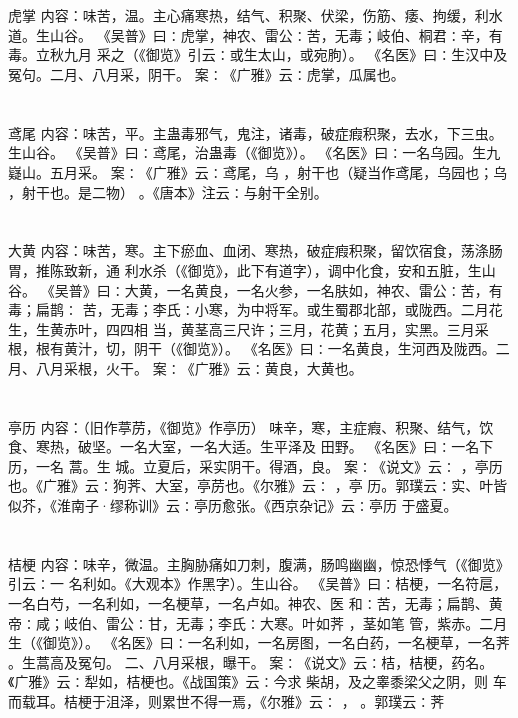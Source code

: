 \documentclass[12pt,UTF8]{ctexbook}
\begin{document}
\section{}虎掌
内容：味苦，温。主心痛寒热，结气、积聚、伏梁，伤筋、痿、拘缓，利水道。生山谷。 
《吴普》曰∶虎掌，神农、雷公∶苦，无毒；岐伯、桐君∶辛，有毒。立秋九月 
采之（《御览》引云∶或生太山，或宛朐）。 
《名医》曰∶生汉中及冤句。二月、八月采，阴干。 
案∶《广雅》云∶虎掌，瓜属也。 


\section{}鸢尾
内容：味苦，平。主蛊毒邪气，鬼注，诸毒，破症瘕积聚，去水，下三虫。生山谷。 
《吴普》曰∶鸢尾，治蛊毒（《御览》）。 
《名医》曰∶一名乌园。生九嶷山。五月采。 
案∶《广雅》云∶鸢尾，乌 ，射干也（疑当作鸢尾，乌园也；乌 ，射干也。是二物） 
。《唐本》注云∶与射干全别。 


\section{}大黄
内容：味苦，寒。主下瘀血、血闭、寒热，破症瘕积聚，留饮宿食，荡涤肠胃，推陈致新，通 
利水杀（《御览》，此下有道字），调中化食，安和五脏，生山谷。 
《吴普》曰∶大黄，一名黄良，一名火参，一名肤如，神农、雷公∶苦，有毒；扁鹊∶ 
苦，无毒；李氏∶小寒，为中将军。或生蜀郡北部，或陇西。二月花生，生黄赤叶，四四相 
当，黄茎高三尺许；三月，花黄；五月，实黑。三月采根，根有黄汁，切，阴干（《御览》）。 
《名医》曰∶一名黄良，生河西及陇西。二月、八月采根，火干。 
案∶《广雅》云∶黄良，大黄也。 


\section{}亭历
内容：（旧作葶苈，《御览》作亭历） 
味辛，寒，主症瘕、积聚、结气，饮食、寒热，破坚。一名大室，一名大适。生平泽及 
田野。 
《名医》曰∶一名下历，一名 蒿。生 城。立夏后，采实阴干。得酒，良。 
案∶《说文》云∶ ，亭历也。《广雅》云∶狗荠、大室，亭苈也。《尔雅》云∶ ，亭 
历。郭璞云∶实、叶皆似芥，《淮南子·缪称训》云∶亭历愈张。《西京杂记》云∶亭历 
于盛夏。 


\section{}桔梗
内容：味辛，微温。主胸胁痛如刀刺，腹满，肠鸣幽幽，惊恐悸气（《御览》引云∶一 
名利如。《大观本》作黑字）。生山谷。 
《吴普》曰∶桔梗，一名符扈，一名白芍，一名利如，一名梗草，一名卢如。神农、医 
和∶苦，无毒；扁鹊、黄帝∶咸；岐伯、雷公∶甘，无毒；李氏∶大寒。叶如荠 ，茎如笔 
管，紫赤。二月生（《御览》）。 
《名医》曰∶一名利如，一名房图，一名白药，一名梗草，一名荠 。生蒿高及冤句。 
二、八月采根，曝干。 
案∶《说文》云∶桔，桔梗，药名。《广雅》云∶犁如，桔梗也。《战国策》云∶今求 
柴胡，及之睾黍梁父之阴，则 车而载耳。桔梗于沮泽，则累世不得一焉，《尔雅》云∶ ， 
。郭璞云∶荠 
\end{document}
